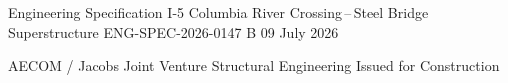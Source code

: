\documentclass[11pt,a4paper]{article}
\begin{document}
\pagecolor{pagebg}

\docctrl
  {Engineering Specification}
  {I-5 Columbia River Crossing\,--\,Steel Bridge Superstructure}
  {ENG-SPEC-2026-0147}
  {B}
  {09 July 2026}

\doctitleblock
  {AECOM / Jacobs Joint Venture}
  {Structural Engineering}
  {Issued for Construction}











\end{document}
